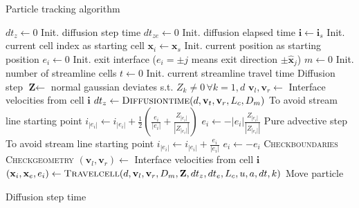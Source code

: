\begin{algorithm}[H]
	\caption{Particle tracking algorithm}
	\label{alg:part_track}
	\begin{algorithmic}[1]
		\State $dt_z\leftarrow0$ \Comment Init. diffusion step time
		\State $dt_{ze}\leftarrow0$ \Comment	Init. diffusion elapsed time
		\State $\textbf{i}\leftarrow \textbf{i}_s$ \Comment Init. current cell index as starting cell
		\State $\textbf{x}_i\leftarrow \textbf{x}_s$ \Comment Init. current position as starting position
		\State $e_i\leftarrow0$ \Comment Init. exit interface ($e_i=\pm j$ means exit direction $\pm\hat{\textbf{x}}_j$)
		\State $m\leftarrow0$ \Comment Init. number of streamline cells
		\State $t\leftarrow0$ \Comment Init. current streamline travel time
		\Repeat
		 \Comment Diffusion step
		\State $\textbf{Z}\leftarrow $ normal gaussian deviates s.t. $Z_k\neq0\,\forall k=1,d$
		\State $\textbf{v}_l,\textbf{v}_r$$\leftarrow$ Interface velocities from cell $\textbf{i}$
		\State $dt_z\leftarrow\textsc{Diffusiontime}(d,\textbf{v}_t,\textbf{v}_r,L_c,D_m)$
		 \Comment To avoid stream line starting point
		\State $i_{|e_i|}\leftarrow i_{|e_i|} + \frac{1}{2}(\frac{e_i}{|e_i|}+\frac{Z_{|e_i|}}{|Z_{|e_i|}|}) $
		\State $e_i \leftarrow -|e_i|\frac{Z_{|e_i|}}{|Z_{|e_i|}|}$ 
		\EndIf
		\Else \Comment Pure advective step
		 \Comment To avoid stream line starting point
		\State $i_{|e_i|}\leftarrow i_{|e_i|} + \frac{e_i}{|e_i|} $ 
		\State $e_i \leftarrow -e_i$ 
		\EndIf
		\EndIf
		\State \textsc{Checkboundaries}
		\State \textsc{Checkgeometry}
		\State $(\textbf{v}_l,\textbf{v}_r)$$\leftarrow$ Interface velocities from cell $\textbf{i}$
		\State $(\textbf{x}_i,\textbf{x}_e,e_i)\leftarrow\textsc{Travelcell}(d, \textbf{v}_l, \textbf{v}_r, D_m, \textbf{Z}, dt_z, dt_e,L_c, u, a, dt, k)$ 
		\Comment Move particle
		\EndProcedure
	\end{algorithmic}
\end{algorithm}

\begin{algorithm}[H]
	\caption{Diffusion step time}
	\label{alg:part_track}
	\begin{algorithmic}[1]
		\EndProcedure
	\end{algorithmic}
\end{algorithm}

